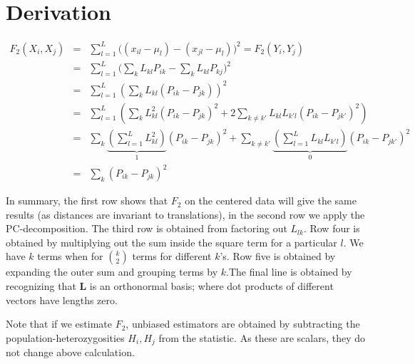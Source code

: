 \documentclass[12pt,a4pape, fullpage]{article}
\newcommand{\ML}{\mathbf{L}} %
\begin{document}
\section{Derivation}\label{appendix:fonpc}
\begin{eqnarray}
F_2(X_i, X_j) &=& \sum_{l=1}^L \big( (x_{il} - \mu_l) -(x_{jl} -\mu_l)\big)^2 = F_2(Y_i, Y_j)\nonumber\\
&=& \sum_{l=1}^L \big( \sum_k L_{kl}P_{ik} - \sum_kL_{kl}P_{kj}\big)^2\nonumber\\
&=& \sum_{l=1}^L \left( \sum_k L_{kl} (P_{ik} -P_{jk}) \right)^2\nonumber\\
&=& \sum_{l=1}^L \left( \sum_k L_{kl}^2 (P_{ik} -P_{jk})^2 + 2\sum_{k\neq k'} L_{kl}L_{k'l}(P_{ik} - P_{jk'})^2 \right)\nonumber\\
&=& \sum_k \underbrace{\left(\sum_{l=1}^L L_{kl}^2\right)}_1 (P_{ik} -P_{jk})^2 + \sum_{k\neq k'}\underbrace{\left(\sum_{l=1}^L L_{kl}L_{k'l}\right)}_{0} (P_{ik} - P_{jk'})^2\nonumber\\
&=& \sum_k (P_{ik} - P_{jk})^2
\end{eqnarray}

In summary, the first row shows that $F_2$ on the centered data will give the same results (as distances are invariant to translations), in the second row we apply the PC-decomposition. The third row is obtained from factoring out $L_{lk}$. Row four is obtained by multiplying out the sum inside the square term for a particular $l$. We have $k$ terms when for $\binom{k}{2}$ terms for different $k$'s.  Row five is obtained by expanding the outer sum and grouping terms by $k$.The final line is obtained by recognizing that $\ML$ is an orthonormal basis; where dot products of different vectors have lengths zero.

Note that if we estimate $F_2$, unbiased estimators are obtained by subtracting the population-heterozygosities $H_i, H_j$ from the statistic. As these are scalars, they do not change above calculation.

\end{document}
